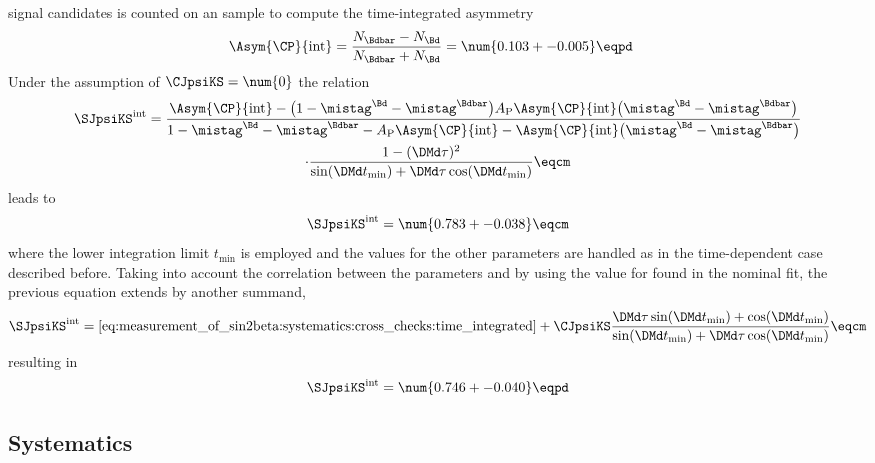 signal candidates is counted on an \sweighted sample to compute the
time-integrated \CP asymmetry
%
\begin{equation}\label{eq:measurement_of_sin2beta:systematics:cross_checks:time_integrated:cp_asym}
  \begin{split}
    \Asym{\CP}{\text{int}} &= \frac{N_{\Bdbar} - N_{\Bd}}{N_{\Bdbar} + N_{\Bd}} = \num{0.103 +- 0.005} \eqpd
  \end{split}
\end{equation}
%
Under the \SM assumption of $\CJpsiKS = \num{0}$ the relation
%
\begin{multline}\label{eq:measurement_of_sin2beta:systematics:cross_checks:time_integrated}
  \SJpsiKS^{\text{int}} = 
  \frac{ \Asym{\CP}{\text{int}} - \bigl( 1 - \mistag^{\Bd} - \mistag^{\Bdbar}\bigr) A_{\text{P}} \Asym{\CP}{\text{int}} \bigl( \mistag^{\Bd} - \mistag^{\Bdbar} \bigr)}
    {1 - \mistag^{\Bd} - \mistag^{\Bdbar} - A_{\text{P}} \Asym{\CP}{\text{int}} - \Asym{\CP}{\text{int}} \bigl( \mistag^{\Bd} - \mistag^{\Bdbar} \bigr) } \\
  \cdot\frac{1 - (\DMd \tau)^2}{ \sin (\DMd t_{\text{min}}) + \DMd \tau \cos (\DMd t_{\text{min}})} \eqcm
\end{multline}
%
leads to 
%
\begin{equation*}
  \SJpsiKS^{\text{int}} = \num{0.783 +- 0.038} \eqcm
\end{equation*}
%
where the lower integration limit $t_{\text{min}}$ is employed and the values
for the other parameters are handled as in the time-dependent case described
before. Taking into account the correlation between the \CP parameters \SJpsiKS
and \CJpsiKS by using the value for \CJpsiKS found in the nominal fit, the
previous equation extends by another summand,
%
\begin{equation}
  \SJpsiKS^{\text{int}} = \text{\cref{eq:measurement_of_sin2beta:systematics:cross_checks:time_integrated}} 
  + \CJpsiKS \frac{\DMd \tau \sin (\DMd t_{\text{min}}) + \cos (\DMd t_{\text{min}})}{\sin (\DMd t_{\text{min}}) + \DMd \tau \cos (\DMd t_{\text{min}})} \eqcm
\end{equation}
%
resulting in
%
\begin{equation*}
  \SJpsiKS^{\text{int}} = \num{0.746 +- 0.040} \eqpd
\end{equation*}
%

\subsection{Systematics}
\label{sec:measurement_of_sin2beta:systematics:systematics}

